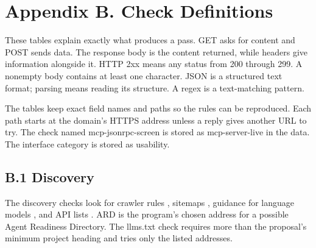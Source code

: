 \documentclass{article}
\begin{document}
\section*{Appendix B. Check Definitions}

These tables explain exactly what produces a pass. GET asks for content and POST sends data. The response body is the content returned, while headers give information alongside it. HTTP 2xx means any status from 200 through 299. A nonempty body contains at least one character. JSON is a structured text format; parsing means reading its structure. A regex is a text-matching pattern.

The tables keep exact field names and paths so the rules can be reproduced. Each path starts at the domain's HTTPS address unless a reply gives another URL to try. The check named mcp-jsonrpc-screen is stored as mcp-server-live in the data. The interface category is stored as usability.

\subsection*{B.1 Discovery}

The discovery checks look for crawler rules \cite{ref4}, sitemaps \cite{ref5}, guidance for language models \cite{ref6}, and API lists \cite{ref7}. ARD is the program's chosen address for a possible Agent Readiness Directory. The llms.txt check requires more than the proposal's minimum project heading and tries only the listed addresses.
\end{document}
